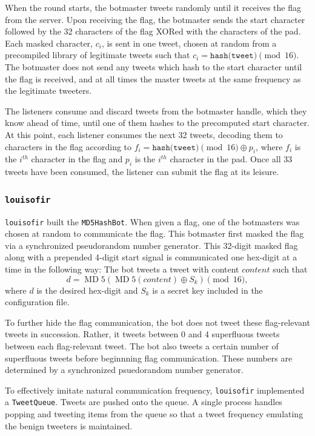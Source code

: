 \documentclass[11pt, oneside]{article} %
\numberwithin{equation}{section} %
\numberwithin{figure}{section} %
\numberwithin{table}{section} %
\renewcommand{\c}[1]{\texttt{#1}}
\newcommand{\teamol}{\c{louisofir}}
\DeclareMathOperator{\MD}{MD}
\begin{document}
            When the round starts, the botmaster tweets randomly until it receives the flag from the server. Upon receiving the flag, the botmaster sends the start character followed by the 32 characters of the flag XORed with the characters of the pad. Each masked character, $c_i$, is sent in one tweet, chosen at random from a precompiled library of legitimate tweets such that $c_i = \texttt{hash(tweet)} \pmod{16}$. The botmaster does not send any tweets which hash to the start character until the flag is received, and at all times the master tweets at the same frequency as the legitimate tweeters.
        	
            The listeners consume and discard tweets from the botmaster handle, which they know ahead of time, until one of them hashes to the precomputed start character. At this point, each listener consumes the next 32 tweets, decoding them to characters in the flag according to $f_i = \texttt{hash(tweet)} \pmod{16} \oplus p_i$, where $f_i$ is the $i^{th}$ character in the flag and $p_i$ is the $i^{th}$ character in the pad. Once all 33 tweets have been consumed, the listener can submit the flag at its leisure.
		\subsubsection{\teamol{}}
			\teamol{} built the \c{MD5HashBot}. When given a flag, one of the botmasters was chosen at random to communicate the flag. This botmaster first masked the flag via a synchronized pseudorandom number generator. This 32-digit masked flag along with a prepended 4-digit start signal is communicated one hex-digit at a time in the following way: The bot tweets a tweet with content $content$ such that
			\[
				d=\MD5(\MD5(content)\oplus S_k) \pmod{16},
			\] 
			where $d$ is the desired hex-digit and $S_k$ is a secret key included in the configuration file.

			To further hide the flag communication, the bot does not tweet these flag-relevant tweets in succession. Rather, it tweets between 0 and 4 superfluous tweets between each  flag-relevant tweet. The bot also tweets a certain number of superfluous tweets before beginnning flag communication. These numbers are determined by a synchronized psuedorandom number generator.

			To effectively imitate natural communication frequency, \teamol{} implemented a \c{TweetQueue}. Tweets are pushed onto the queue. A single process handles popping and tweeting items from the queue so that a tweet frequency emulating the benign tweeters is maintained.
\end{document}

